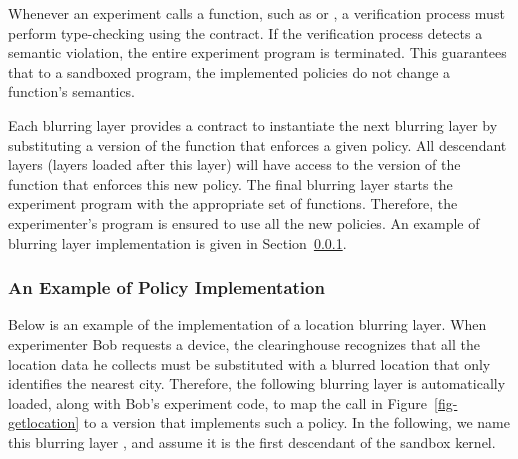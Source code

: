 Whenever an experiment calls a function, such as 
or , a verification process must perform 
type-checking using the contract. If the verification process 
detects a semantic violation,  the entire experiment program is 
terminated. This guarantees that to a sandboxed program, 
the implemented policies do not change a function's semantics.


Each blurring layer provides a contract to instantiate the 
next blurring layer by substituting a version of the function that 
enforces a given policy. All descendant layers (layers loaded 
after this layer) will have access to the version of the function 
that enforces this new policy. The final blurring layer starts the 
experiment program with the appropriate set of functions. 
Therefore, the experimenter's program is ensured to use all the 
new policies. An example of blurring layer implementation is given in 
Section~\ref{sec-precision-example}.  

\subsubsection{An Example of Policy Implementation}
\label{sec-precision-example}


Below is an example of the implementation of a location blurring layer. 
When experimenter Bob requests a device, the clearinghouse recognizes that all the location data
he collects must be substituted with a blurred location that only identifies the nearest city.
Therefore, the following blurring layer is
automatically loaded, along with Bob's experiment code, to map 
the  call in Figure~\ref{fig-getlocation} to a version 
that implements such a policy. In the following, we name this
blurring layer , and assume it is the first descendant
of the sandbox kernel.

